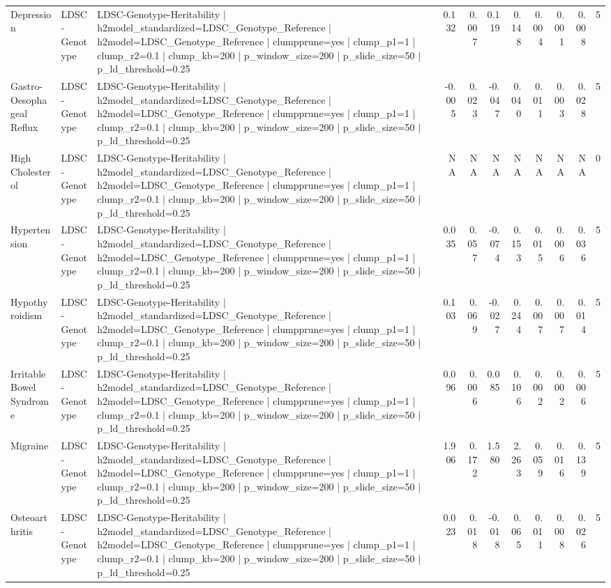 \begin{landscape}
\begin{longtable}{p{2.4cm}p{1.8cm}p{6.0cm}rrrrrrrr}
Depression & LDSC-Genotype & LDSC-Genotype-Heritability | h2model\_standardized=LDSC\_Genotype\_Reference | h2model=LDSC\_Genotype\_Reference | clumpprune=yes | clump\_p1=1 | clump\_r2=0.1 | clump\_kb=200 | p\_window\_size=200 | p\_slide\_size=50 | p\_ld\_threshold=0.25 & 0.132 & 0.007 & 0.119 & 0.148 & 0.004 & 0.001 & 0.008 & 5 \\
Gastro-Oesophageal Reflux & LDSC-Genotype & LDSC-Genotype-Heritability | h2model\_standardized=LDSC\_Genotype\_Reference | h2model=LDSC\_Genotype\_Reference | clumpprune=yes | clump\_p1=1 | clump\_r2=0.1 | clump\_kb=200 | p\_window\_size=200 | p\_slide\_size=50 | p\_ld\_threshold=0.25 & -0.005 & 0.023 & -0.047 & 0.040 & 0.011 & 0.003 & 0.028 & 5 \\
High Cholesterol & LDSC-Genotype & LDSC-Genotype-Heritability | h2model\_standardized=LDSC\_Genotype\_Reference | h2model=LDSC\_Genotype\_Reference | clumpprune=yes | clump\_p1=1 | clump\_r2=0.1 | clump\_kb=200 | p\_window\_size=200 | p\_slide\_size=50 | p\_ld\_threshold=0.25 & NA & NA & NA & NA & NA & NA & NA & 0 \\
Hypertension & LDSC-Genotype & LDSC-Genotype-Heritability | h2model\_standardized=LDSC\_Genotype\_Reference | h2model=LDSC\_Genotype\_Reference | clumpprune=yes | clump\_p1=1 | clump\_r2=0.1 | clump\_kb=200 | p\_window\_size=200 | p\_slide\_size=50 | p\_ld\_threshold=0.25 & 0.035 & 0.057 & -0.074 & 0.153 & 0.015 & 0.006 & 0.036 & 5 \\
Hypothyroidism & LDSC-Genotype & LDSC-Genotype-Heritability | h2model\_standardized=LDSC\_Genotype\_Reference | h2model=LDSC\_Genotype\_Reference | clumpprune=yes | clump\_p1=1 | clump\_r2=0.1 | clump\_kb=200 | p\_window\_size=200 | p\_slide\_size=50 | p\_ld\_threshold=0.25 & 0.103 & 0.069 & -0.027 & 0.244 & 0.007 & 0.007 & 0.014 & 5 \\
Irritable Bowel Syndrome & LDSC-Genotype & LDSC-Genotype-Heritability | h2model\_standardized=LDSC\_Genotype\_Reference | h2model=LDSC\_Genotype\_Reference | clumpprune=yes | clump\_p1=1 | clump\_r2=0.1 | clump\_kb=200 | p\_window\_size=200 | p\_slide\_size=50 | p\_ld\_threshold=0.25 & 0.096 & 0.006 & 0.085 & 0.106 & 0.002 & 0.002 & 0.006 & 5 \\
Migraine & LDSC-Genotype & LDSC-Genotype-Heritability | h2model\_standardized=LDSC\_Genotype\_Reference | h2model=LDSC\_Genotype\_Reference | clumpprune=yes | clump\_p1=1 | clump\_r2=0.1 | clump\_kb=200 | p\_window\_size=200 | p\_slide\_size=50 | p\_ld\_threshold=0.25 & 1.906 & 0.172 & 1.580 & 2.263 & 0.059 & 0.016 & 0.139 & 5 \\
Osteoarthritis & LDSC-Genotype & LDSC-Genotype-Heritability | h2model\_standardized=LDSC\_Genotype\_Reference | h2model=LDSC\_Genotype\_Reference | clumpprune=yes | clump\_p1=1 | clump\_r2=0.1 | clump\_kb=200 | p\_window\_size=200 | p\_slide\_size=50 | p\_ld\_threshold=0.25 & 0.023 & 0.018 & -0.018 & 0.065 & 0.011 & 0.008 & 0.026 & 5 \\
\end{longtable}
\end{landscape}
